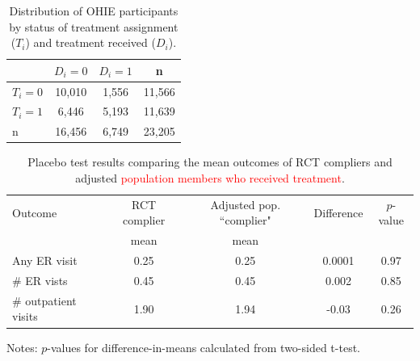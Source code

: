 \documentclass[hidelinks,12pt]{article}
\begin{document}
\begin{appendices}
\begin{table}[h]
	\begin{center}
	\caption{Distribution of OHIE participants by status of treatment assignment ($T_i$) and treatment received ($D_i$).\label{ohie-status}} 
	\begin{tabular}{@{}lccc@{}}
		\toprule
		& $D_i = 0$ & $D_i = 1$ & n      \\ \midrule
		$T_i = 0$ & 10,010    & 1,556     & 11,566 \\
		$T_i = 1$ & 6,446     & 5,193     & 11,639 \\
		n         & 16,456    & 6,749     & 23,205 \\ \bottomrule
	\end{tabular}
	\end{center}
\end{table}

\begin{table}[h]
	\begin{center}
		\caption{Placebo test results comparing the mean outcomes of RCT compliers and adjusted \textcolor{red}{population members who received treatment}.\label{placebo}} 
	\begin{tabular}{@{}lcccc@{}}
		\toprule
		Outcome                & RCT complier & Adjusted pop. ``complier" & Difference & $p$-value \\
				                &  mean & mean & &  \\		
		 \midrule
		Any ER visit           & 0.25              & 0.25                           & 0.0001     & 0.97    \\
		$\#$ ER vists          & 0.45              & 0.45                           & 0.002      & 0.85    \\
		$\#$ outpatient visits & 1.90              & 1.94                           & -0.03      & 0.26    \\ \bottomrule
	\end{tabular}
\end{center}
\footnotesize{Notes: $p$-values for difference-in-means calculated from two-sided t-test.}
\end{table}


\end{appendices}
\end{document}
